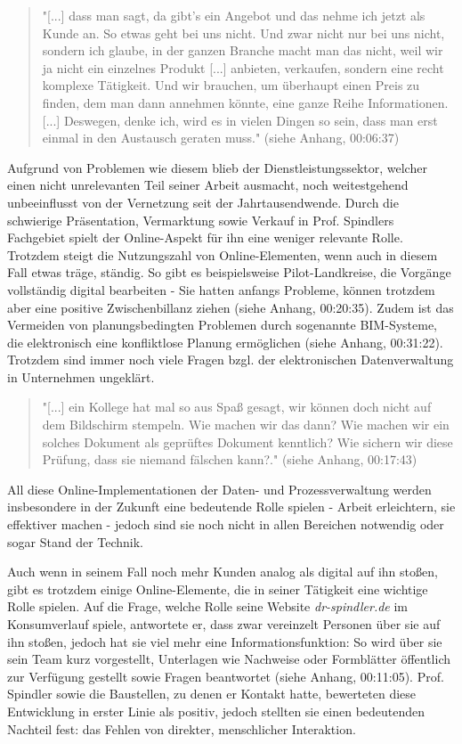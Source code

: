 \begin{folding}
\begin{quote}
"[...] dass man sagt, da gibt's ein Angebot und das nehme ich jetzt als Kunde an. So etwas geht bei uns nicht. Und zwar nicht nur bei uns nicht, sondern ich glaube, in der ganzen Branche macht man das nicht, weil wir ja nicht ein einzelnes Produkt [...] anbieten, verkaufen, sondern eine recht komplexe Tätigkeit. Und wir brauchen, um überhaupt einen Preis zu finden, dem man dann annehmen könnte, eine ganze Reihe Informationen. [...] Deswegen, denke ich, wird es in vielen Dingen so sein, dass man erst einmal in den Austausch geraten muss." (siehe Anhang, 00:06:37)
\end{quote} 
Aufgrund von Problemen wie diesem blieb der Dienstleistungssektor, welcher einen nicht unrelevanten Teil seiner Arbeit ausmacht, noch weitestgehend unbeeinflusst von der Vernetzung seit der Jahrtausendwende. Durch die schwierige Präsentation, Vermarktung sowie Verkauf in Prof. Spindlers Fachgebiet spielt der Online-Aspekt für ihn eine weniger relevante Rolle. Trotzdem steigt die Nutzungszahl von Online-Elementen, wenn auch in diesem Fall etwas träge, ständig. So gibt es beispielsweise Pilot-Landkreise, die Vorgänge vollständig digital bearbeiten - Sie hatten anfangs Probleme, können trotzdem aber eine positive Zwischenbillanz ziehen (siehe Anhang, 00:20:35). Zudem ist das Vermeiden von planungsbedingten Problemen durch sogenannte \ac{BIM}-Systeme, die elektronisch eine konfliktlose Planung ermöglichen (siehe Anhang, 00:31:22). Trotzdem sind immer noch viele Fragen bzgl. der elektronischen Datenverwaltung in Unternehmen ungeklärt.

\begin{quote}
"[...] ein Kollege hat mal so aus Spaß gesagt, wir können doch nicht auf dem Bildschirm stempeln. Wie machen wir das dann? Wie machen wir ein solches Dokument als geprüftes Dokument kenntlich? Wie sichern wir diese Prüfung, dass sie niemand fälschen kann?." (siehe Anhang, 00:17:43)
\end{quote} 
All diese Online-Implementationen der Daten- und Prozessverwaltung werden insbesondere in der Zukunft eine bedeutende Rolle spielen - Arbeit erleichtern, sie effektiver machen - jedoch sind sie noch nicht in allen Bereichen notwendig oder sogar Stand der Technik.

Auch wenn in seinem Fall noch mehr Kunden analog als digital auf ihn stoßen, gibt es trotzdem einige Online-Elemente, die in seiner Tätigkeit eine wichtige Rolle spielen. Auf die Frage, welche Rolle seine Website \emph{dr-spindler.de} im Konsumverlauf spiele, antwortete er, dass zwar vereinzelt Personen über sie auf ihn stoßen, jedoch hat sie viel mehr eine Informationsfunktion: So wird über sie sein Team kurz vorgestellt, Unterlagen wie Nachweise oder Formblätter öffentlich zur Verfügung gestellt sowie Fragen beantwortet (siehe Anhang, 00:11:05). Prof. Spindler sowie die Baustellen, zu denen er Kontakt hatte, bewerteten diese Entwicklung in erster Linie als positiv, jedoch stellten sie einen bedeutenden Nachteil fest: das Fehlen von direkter, menschlicher Interaktion. 

\end{folding}
